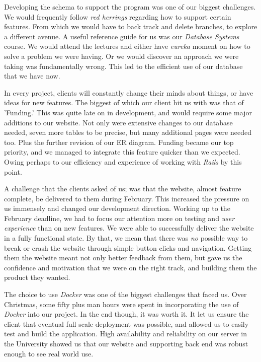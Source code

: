 \documentclass{l3proj}
\begin{document}
Developing the schema to support the program was one of our biggest challenges. We would frequently follow \textit{red herrings} regarding how to support certain features. From which we would have to back track and delete branches, to explore a different avenue. A useful reference guide for us was our \textit{Database Systems} course. We would attend the lectures and either have \textit{eureka} moment on how to solve a problem we were having. Or we would discover an approach we were taking was fundamentally wrong. This led to the efficient use of our database that we have now.

In every project, clients will constantly change their minds about things, or have ideas for new features. The biggest of which our client hit us with was that of 'Funding.' This was quite late on in development, and would require some major additions to our website. Not only were extensive changes to our database needed, seven more tables to be precise, but many additional pages were needed too. Plus the further revision of our ER diagram. Funding became our top priority, and we managed to integrate this feature quicker than we expected. Owing perhaps to our efficiency and experience of working with \textit{Rails} by this point.

A challenge that the clients asked of us; was that the website, almost feature complete, be delivered to them during February. This increased the pressure on us immensely and changed our development direction. Working up to the February deadline, we had to focus our attention more on testing and \textit{user experience} than on new features. We were able to successfully deliver the website in a fully functional state. By that, we mean that there was \textit{no} possible way to break or crash the website through simple button clicks and navigation. Getting them the website meant not only better feedback from them, but gave us the confidence and motivation that we were on the right track, and building them the product they wanted.

The choice to use \textit{Docker} was one of the biggest challenges that faced us. Over Christmas, some fifty plus man hours were spent in incorporating the use of \textit{Docker} into our project. In the end though, it was worth it. It let us ensure the client that eventual full scale deployment was possible, and allowed us to easily test and build the application. High availability and reliability on our server in the University showed us that our website and supporting back end was robust enough to see real world use.
\end{document}
